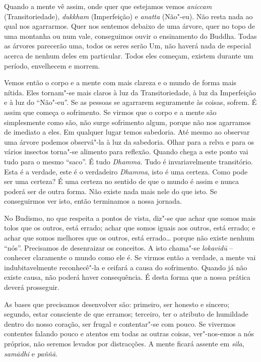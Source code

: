Quando a mente vê assim, onde quer que estejamos vemos \emph{aniccam}
(Transitoriedade), \emph{dukkham} (Imperfeição) e \emph{anatta}
(Não"-eu). Não resta nada ao qual nos agarrarmos. Quer nos sentemos
debaixo de uma árvore, quer no topo de uma montanha ou num vale,
conseguimos ouvir o ensinamento do Buddha. Todas as árvores parecerão
uma, todos os seres serão Um, não haverá nada de especial acerca de
nenhum deles em particular. Todos eles começam, existem durante um
período, envelhecem e morrem.

Vemos então o corpo e a mente com mais clareza e o mundo de forma mais
nítida. Eles tornam"-se mais claros à luz da Transitoriedade, à luz da
Imperfeição e à luz do ``Não"-eu''. Se as pessoas se agarrarem
seguramente às coisas, sofrem. É assim que começa o sofrimento. Se
virmos que o corpo e a mente são simplesmente como são, não surge
sofrimento algum, porque não nos agarramos de imediato a eles. Em
qualquer lugar temos sabedoria. Até mesmo ao observar uma árvore podemos
observá"-la à luz da sabedoria. Olhar para a relva e para os vários
insectos torna"-se alimento para reflexão. Quando chega a este ponto vai
tudo para o mesmo ``saco''. É tudo \emph{Dhamma.} Tudo é invariavelmente
transitório. Esta é a verdade, este é o verdadeiro \emph{Dhamma}, isto é
uma certeza. Como pode ser uma certeza? É uma certeza no sentido de que
o mundo é assim e nunca poderá ser de outra forma. Não existe nada mais
nele do que isto. Se conseguirmos ver isto, então terminamos a nossa
jornada.

No Budismo, no que respeita a pontos de vista, diz"-se que achar que
somos mais tolos que os outros, está errado; achar que somos iguais aos
outros, está errado; e achar que somos melhores que os outros, está
errado\ldots{} porque não existe nenhum ``nós''. Precisamos de
desenraizar os conceitos. A isto chama"-se \emph{lokavidū} -- conhecer
claramente o mundo como ele é. Se virmos então a verdade, a mente vai
indubitavelmente reconhecê"-la e ceifará a causa do sofrimento. Quando já
não existe causa, não poderá haver consequência. É desta forma que a
nossa prática deverá prosseguir.

As bases que precisamos desenvolver são: primeiro, ser honesto e
sincero; segundo, estar consciente de que erramos; terceiro, ter o
atributo de humildade dentro do nosso coração, ser frugal e contentar"-se
com pouco. Se vivermos contentes falando pouco e atentos em todas as
outras coisas, ver"-nos-emos a nós próprios, não seremos levados por
distracções. A mente ficará assente em \emph{sila}, \emph{samādhi} e
\emph{paññā}.

